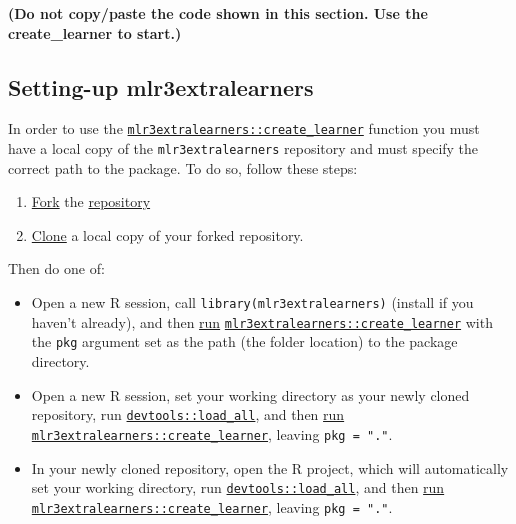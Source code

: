 \documentclass[
]{scrbook}
\providecommand{\tightlist}{%
  \setlength{\itemsep}{0pt}\setlength{\parskip}{0pt}}
\begin{document}
\textbf{(Do not copy/paste the code shown in this section. Use the create\_learner to start.)}

\hypertarget{setup}{%
\subsection{Setting-up mlr3extralearners}\label{setup}}

In order to use the \href{https://mlr3extralearners.mlr-org.com/reference/create_learner.html}{\texttt{mlr3extralearners::create\_learner}} function you must have a local copy of the \texttt{mlr3extralearners} repository and must specify the correct path to the package. To do so, follow these steps:

\begin{enumerate}
\def\labelenumi{\arabic{enumi}.}
\tightlist
\item
  \href{https://docs.github.com/en/free-pro-team@latest/github/getting-started-with-github/fork-a-repo}{Fork} the \href{https://github.com/mlr-org/mlr3extralearners}{repository}
\item
  \href{https://docs.github.com/en/free-pro-team@latest/github/creating-cloning-and-archiving-repositories/cloning-a-repository}{Clone} a local copy of your forked repository.
\end{enumerate}

Then do one of:

\begin{itemize}
\tightlist
\item
  Open a new R session, call \texttt{library(mlr3extralearners)} (install if you haven't already), and then \protect\hyperlink{create-learner}{run} \href{https://mlr3extralearners.mlr-org.com/reference/create_learner.html}{\texttt{mlr3extralearners::create\_learner}} with the \texttt{pkg} argument set as the path (the folder location) to the package directory.
\item
  Open a new R session, set your working directory as your newly cloned repository, run \href{https://www.rdocumentation.org/packages/devtools/topics/load_all}{\texttt{devtools::load\_all}}, and then \protect\hyperlink{create-learner}{run} \href{https://mlr3extralearners.mlr-org.com/reference/create_learner.html}{\texttt{mlr3extralearners::create\_learner}}, leaving \texttt{pkg\ =\ "."}.
\item
  In your newly cloned repository, open the R project, which will automatically set your working directory, run \href{https://www.rdocumentation.org/packages/devtools/topics/load_all}{\texttt{devtools::load\_all}}, and then \protect\hyperlink{create-learner}{run} \href{https://mlr3extralearners.mlr-org.com/reference/create_learner.html}{\texttt{mlr3extralearners::create\_learner}}, leaving \texttt{pkg\ =\ "."}.
\end{itemize}
\end{document}
